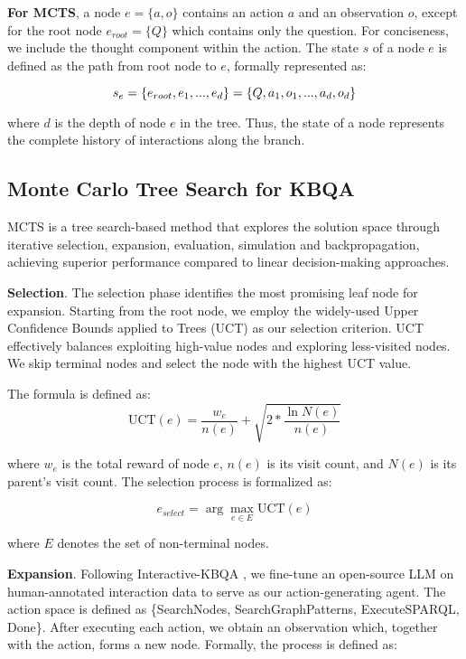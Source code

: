 \textbf{For MCTS}, a node $e=\{a, o\}$ contains an action $a$ and an observation $o$, except for the root node $e_{root}=\{Q\}$ which contains only the question.
For conciseness, we include the thought component within the action.
The state $s$ of a node $e$ is defined as the path from root node to $e$, formally represented as:

\begin{equation}
    s_e = \{e_{root}, e_1, ..., e_d\} \nonumber \\
    = \{Q, a_1, o_1, ..., a_d, o_d\}
\end{equation}

where $d$ is the depth of node $e$ in the tree. Thus, the state of a node represents the complete history of interactions along the branch.

\subsection{Monte Carlo Tree Search for KBQA}

MCTS is a tree search-based method that explores the solution space through iterative selection, expansion, evaluation, simulation and backpropagation, achieving superior performance compared to linear decision-making approaches.

\textbf{Selection}. The selection phase identifies the most promising leaf node for expansion. Starting from the root node, we employ the widely-used Upper Confidence Bounds applied to Trees (UCT) as our selection criterion. UCT effectively balances exploiting high-value nodes and exploring less-visited nodes.
We skip terminal nodes and select the node with the highest UCT value.

The formula is defined as:
\begin{equation}
    \text{UCT}(e) = \frac{w_e}{n(e)} + \sqrt{2 * \frac{\ln N(e)}{n(e)}}
\end{equation}

where $w_e$ is the total reward of node $e$, $n(e)$ is its visit count, and $N(e)$ is its parent's visit count.
The selection process is formalized as:

\begin{equation}
    e_{select} = \arg\max_{e \in E} \text{UCT}(e)
\end{equation}

where $E$ denotes the set of non-terminal nodes.

\textbf{Expansion}.
Following Interactive-KBQA \citep{Xiong-Guanming-ACL-2024-Interactive-KBQA}, we fine-tune an open-source LLM on human-annotated interaction data to serve as our action-generating agent.
The action space is defined as \{SearchNodes, SearchGraphPatterns, ExecuteSPARQL, Done\}.
After executing each action, we obtain an observation which, together with the action, forms a new node.
Formally, the process is defined as:

